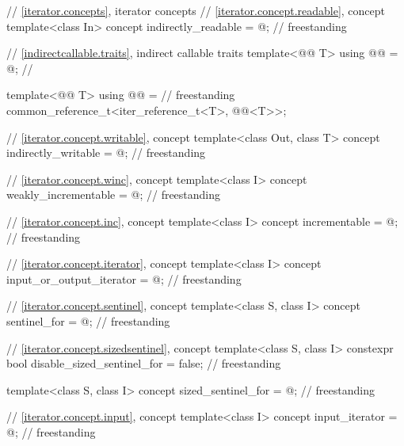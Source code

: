 \begin{codeblock}
{  // \ref{iterator.concepts}, iterator concepts
  // \ref{iterator.concept.readable}, concept 
  template<class In>
    concept indirectly_readable = @\seebelow@;                                        // freestanding

  // \ref{indirectcallable.traits}, indirect callable traits
  template<@@ T>
    using @@ = @\seebelow@;         // \expos

  template<@@ T>
    using @@ =                                                 // freestanding
      common_reference_t<iter_reference_t<T>, @@<T>>;

  // \ref{iterator.concept.writable}, concept 
  template<class Out, class T>
    concept indirectly_writable = @\seebelow@;                                        // freestanding

  // \ref{iterator.concept.winc}, concept 
  template<class I>
    concept weakly_incrementable = @\seebelow@;                                       // freestanding

  // \ref{iterator.concept.inc}, concept 
  template<class I>
    concept incrementable = @\seebelow@;                                              // freestanding

  // \ref{iterator.concept.iterator}, concept 
  template<class I>
    concept input_or_output_iterator = @\seebelow@;                                   // freestanding

  // \ref{iterator.concept.sentinel}, concept 
  template<class S, class I>
    concept sentinel_for = @\seebelow@;                                               // freestanding

  // \ref{iterator.concept.sizedsentinel}, concept 
  template<class S, class I>
    constexpr bool disable_sized_sentinel_for = false;                              // freestanding

  template<class S, class I>
    concept sized_sentinel_for = @\seebelow@;                                         // freestanding

  // \ref{iterator.concept.input}, concept 
  template<class I>
    concept input_iterator = @\seebelow@;                                             // freestanding

}
\end{codeblock}
